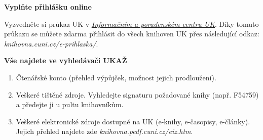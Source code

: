 

\ifdefined\ikonka\else%
\newcommand\ikonka[1]{\bigskip\bgroup\Large #1\egroup\par}
\renewcommand\section[2][]{%
  \bgroup\large \textbf{#2}\egroup\par%
}
\fi
\ikonka{\faPencil}
\section{Vyplňte přihlášku online}

Vyzvedněte si průkaz UK v \href{http://www.cuni.cz/UK-3249.html}{\emph{Informačním a poradenském
centru UK}}. 
Díky tomuto průkazu se můžete zdarma přihlásit do všech knihoven UK přes následující odkaz:
\textit{knihovna.cuni.cz/e-prihlaska/}.

\ikonka{\faSearch}
\section{Vše najdete ve vyhledávači UKAŽ}

\vspace{-1em}
\begin{enumerate}
  \item Čtenářské konto (přehled výpůjček, možnost jejich prodloužení).

  \item Veškeré tištěné zdroje. Vyhledejte signaturu požadované knihy (např. F54759) a předejte ji u pultu knihovníkům.

  \item Veškeré elektronické zdroje dostupné na UK (e-knihy, e-časopisy, e-články).\\ Jejich přehled najdete zde \textit{knihovna.pedf.cuni.cz/eiz.htm}.
\end{enumerate}

\vspace{-1em}
\ikonka{\faBook}
